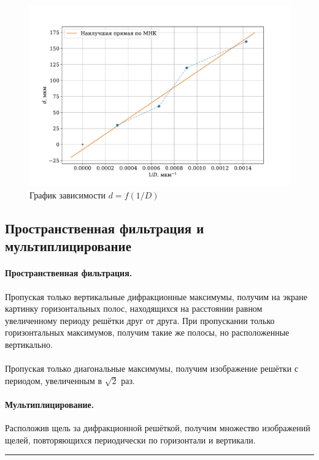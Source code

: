 \documentclass[a4paper,12pt]{article} %
\begin{document}
\begin{figure}
\centering
\includegraphics[width=\textwidth]{plot.pdf}
\caption{График зависимости $d = f(1/D)$}
\label{fig:plot}
\end{figure}

\subsection{Пространственная фильтрация и мультиплицирование}

\paragraph{Пространственная фильтрация.} Пропуская только вертикальные дифракционные максимумы, получим на экране картинку горизонтальных полос, находящихся на расстоянии равном увеличенному периоду решётки друг от друга. При пропускании только горизонтальных максимумов, получим такие же полосы, но расположенные вертикально.
\paragraph{} Пропуская только диагональные максимумы, получим изображение решётки с периодом, увеличенным в $\sqrt{2}$ раз. 

\paragraph{Мультиплицирование.} Расположив щель за дифракционной решёткой, получим множество изображений щелей, повторяющихся периодически по горизонтали и вертикали.

\medskip\hrule\medskip
\end{document}
